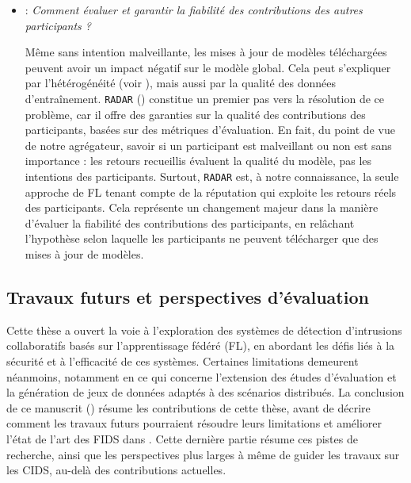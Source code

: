 \begin{itemize}[listparindent=\parindent,itemsep=.6\baselineskip]
  \item {} : \emph{Comment évaluer et garantir la fiabilité des contributions des autres participants ?}

  Même sans intention malveillante, les mises à jour de modèles téléchargées peuvent avoir un impact négatif sur le modèle global.  
  Cela peut s'expliquer par l'hétérogénéité (voir ), mais aussi par la qualité des données d'entraînement.  
  \texttt{RADAR} () constitue un premier pas vers la résolution de ce problème, car il offre des garanties sur la qualité des contributions des participants, basées sur des métriques d'évaluation.  
  En fait, du point de vue de notre agrégateur, savoir si un participant est malveillant ou non est sans importance : les retours recueillis évaluent la qualité du modèle, pas les intentions des participants.  
  Surtout, \texttt{RADAR} est, à notre connaissance, la seule approche de FL tenant compte de la réputation qui exploite les retours réels des participants.  
  Cela représente un changement majeur dans la manière d'évaluer la fiabilité des contributions des participants, en relâchant l'hypothèse selon laquelle les participants ne peuvent télécharger que des mises à jour de modèles.

\end{itemize}


\subsection{Travaux futurs et perspectives d'évaluation\label{sec:french.future}}

Cette thèse a ouvert la voie à l'exploration des systèmes de détection d'intrusions collaboratifs basés sur l'apprentissage fédéré (FL), en abordant les défis liés à la sécurité et à l'efficacité de ces systèmes.
Certaines limitations demeurent néanmoins, notamment en ce qui concerne l'extension des études d'évaluation et la génération de jeux de données adaptés à des scénarios distribués.
La conclusion de ce manuscrit () résume les contributions de cette thèse, avant de décrire comment les travaux futurs pourraient résoudre leurs limitations et améliorer l'état de l'art des FIDS dans .
Cette dernière partie résume ces pistes de recherche, ainsi que les perspectives plus larges à même de guider les travaux sur les CIDS, au-delà des contributions actuelles.

